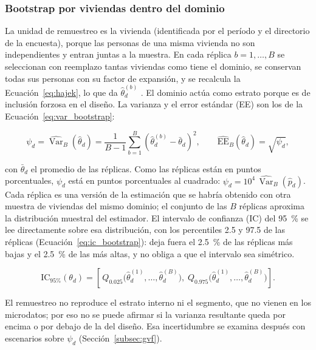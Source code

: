 \subsubsection{Bootstrap por viviendas dentro del dominio}

La unidad de remuestreo es la vivienda (identificada por el período y el directorio de la encuesta), porque las personas de una misma vivienda no son independientes y entran juntas a la muestra. En cada réplica $b = 1, \ldots, B$ se seleccionan con reemplazo tantas viviendas como tiene el dominio, se conservan todas sus personas con su factor de expansión, y se recalcula la Ecuación~\ref{eq:hajek}, lo que da $\hat{\theta}_d^{(b)}$ \cite[pp.~26--27, 61]{morales2021smallarea}. El dominio actúa como estrato porque es de inclusión forzosa en el diseño. La varianza y el error estándar (EE) son los de la Ecuación~\ref{eq:var_bootstrap}:

\begin{equation}
    \psi_d = \widehat{\operatorname{Var}}_B(\hat{\theta}_d) = \frac{1}{B-1} \sum_{b=1}^{B} \left(\hat{\theta}_d^{(b)} - \bar{\theta}_d\right)^2, \qquad \widehat{\text{EE}}_B(\hat{\theta}_d) = \sqrt{\psi_d},
    \label{eq:var_bootstrap}
\end{equation}

con $\bar{\theta}_d$ el promedio de las réplicas. Como las réplicas están en puntos porcentuales, $\psi_d$ está en puntos porcentuales al cuadrado: $\psi_d = 10^4\,\widehat{\operatorname{Var}}_B(\hat{p}_d)$. Cada réplica es una versión de la estimación que se habría obtenido con otra muestra de viviendas del mismo dominio; el conjunto de las $B$ réplicas aproxima la distribución muestral del estimador. El intervalo de confianza (IC) del 95~\% se lee directamente sobre esa distribución, con los percentiles 2.5 y 97.5 de las réplicas (Ecuación~\ref{eq:ic_bootstrap}): deja fuera el 2.5~\% de las réplicas más bajas y el 2.5~\% de las más altas, y no obliga a que el intervalo sea simétrico.

\begin{equation}
    \text{IC}_{95\%}(\theta_d) = \left[\,Q_{0.025}\big(\hat{\theta}_d^{(1)},\ldots,\hat{\theta}_d^{(B)}\big),\; Q_{0.975}\big(\hat{\theta}_d^{(1)},\ldots,\hat{\theta}_d^{(B)}\big)\right].
    \label{eq:ic_bootstrap}
\end{equation}

El remuestreo no reproduce el estrato interno ni el segmento, que no vienen en los microdatos; por eso no se puede afirmar si la varianza resultante queda por encima o por debajo de la del diseño. Esa incertidumbre se examina después con escenarios sobre $\psi_d$ (Sección~\ref{subsec:gvf}).

